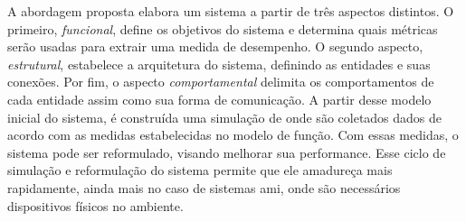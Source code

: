 A abordagem proposta elabora um sistema a partir de três aspectos distintos. O primeiro, \textit{funcional}, define os objetivos do sistema e determina quais métricas serão usadas para extrair uma medida de desempenho. O segundo aspecto, \textit{estrutural}, estabelece a arquitetura do sistema, definindo as entidades e suas conexões. Por fim, o aspecto \textit{comportamental} delimita os comportamentos de cada entidade assim como sua forma de comunicação. A partir desse modelo inicial do sistema, é construída uma simulação de onde são coletados dados de acordo com as medidas estabelecidas no modelo de função. Com essas medidas, o sistema pode ser reformulado, visando melhorar sua performance. 
Esse ciclo de simulação e reformulação do sistema permite que ele amadureça mais rapidamente, ainda mais no caso de sistemas \acrshort{ami}, onde são necessários dispositivos físicos no ambiente. 
    

    
    
    
 


